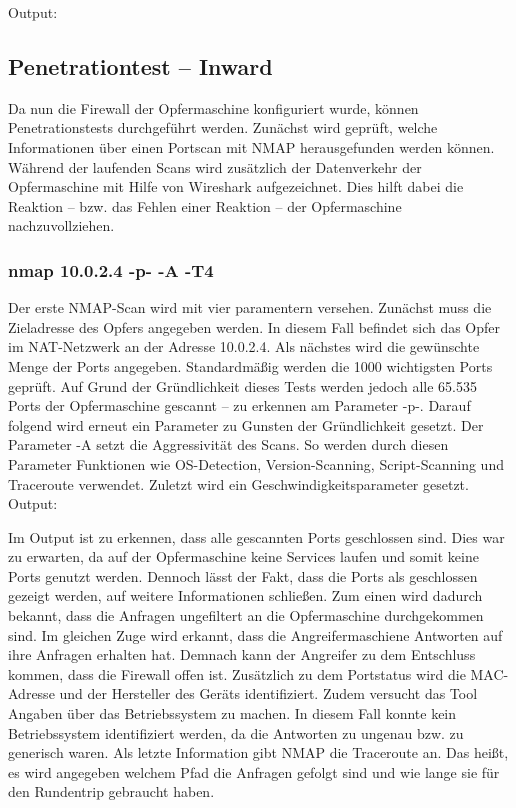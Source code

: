 

\newpage
Output: 


\subsection{Penetrationtest – Inward}
Da nun die Firewall der Opfermaschine konfiguriert wurde, können Penetrationstests durchgeführt werden. 
Zunächst wird geprüft, welche Informationen über einen Portscan mit NMAP herausgefunden werden können. 
Während der laufenden Scans wird zusätzlich der Datenverkehr der Opfermaschine mit Hilfe von Wireshark aufgezeichnet. 
Dies hilft dabei die Reaktion – bzw. das Fehlen einer Reaktion – der Opfermaschine nachzuvollziehen.
\subsubsection{nmap 10.0.2.4 -p- -A -T4}
Der erste NMAP-Scan wird mit vier paramentern versehen. Zunächst muss die Zieladresse des Opfers angegeben werden. In diesem Fall befindet sich das Opfer im NAT-Netzwerk an der Adresse 10.0.2.4. Als nächstes wird die gewünschte Menge der Ports angegeben. Standardmäßig werden die 1000 wichtigsten Ports geprüft. Auf Grund der Gründlichkeit dieses Tests werden jedoch alle 65.535 Ports der Opfermaschine gescannt – zu erkennen am Parameter -p-. Darauf folgend wird erneut ein Parameter zu Gunsten der Gründlichkeit gesetzt. Der Parameter -A setzt die Aggressivität des Scans. So werden durch diesen Parameter Funktionen wie OS-Detection, Version-Scanning, Script-Scanning und Traceroute verwendet. Zuletzt wird ein Geschwindigkeitsparameter gesetzt. \\

Output:


Im Output ist zu erkennen, dass alle gescannten Ports geschlossen sind. Dies war zu erwarten, da auf der Opfermaschine keine Services laufen und somit keine Ports genutzt werden. Dennoch lässt der Fakt, dass die Ports als geschlossen gezeigt werden, auf weitere Informationen schließen. Zum einen wird dadurch bekannt, dass die Anfragen ungefiltert an die Opfermaschine durchgekommen sind. Im gleichen Zuge wird erkannt, dass die Angreifermaschiene Antworten auf ihre Anfragen erhalten hat. Demnach kann der Angreifer zu dem Entschluss kommen, dass die Firewall offen ist. 
Zusätzlich zu dem Portstatus wird die MAC-Adresse und der Hersteller des Geräts identifiziert. Zudem versucht das Tool Angaben über das Betriebssystem zu machen. In diesem Fall konnte kein Betriebssystem identifiziert werden, da die Antworten zu ungenau bzw. zu generisch waren. Als letzte Information gibt NMAP die Traceroute an. Das heißt, es wird angegeben welchem Pfad die Anfragen gefolgt sind und wie lange sie für den Rundentrip gebraucht haben.

